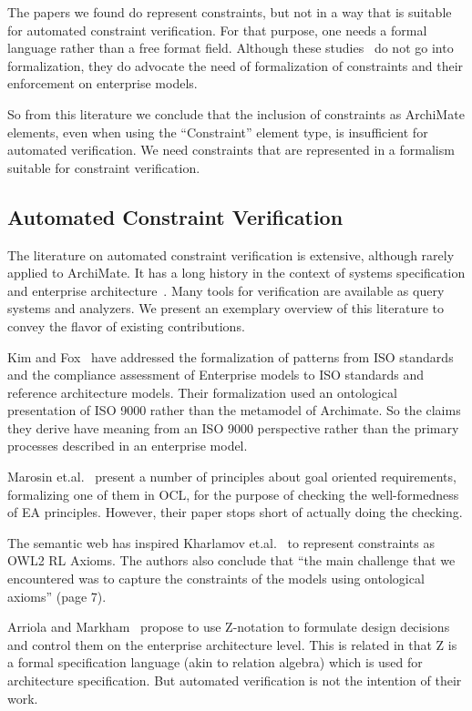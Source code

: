 \documentclass[sn-vancouver]{sn-jnl}%
\begin{document}
The papers we found do represent constraints, but not in a way that is suitable for automated constraint verification.
For that purpose, one needs a formal language rather than a free format field.
Although these studies~\cite{korman2016modeling,tepandi2019towards,mayer2019integrated,zhi2018imsa,blanco2019using} do not go into formalization,
they do advocate the need of formalization of constraints and their enforcement on enterprise models.

So from this literature we conclude that the inclusion of constraints as ArchiMate elements, even when using the ``Constraint'' element type,
is insufficient for automated verification.
We need constraints that are represented in a formalism suitable for constraint verification.

\subsection{Automated Constraint Verification}\label{Verif}
The literature on automated constraint verification is extensive, although rarely applied to ArchiMate.
It has a long history in the context of systems specification and enterprise architecture~\cite{chapurlat2008verification}.
Many tools for verification are available as query systems and analyzers.
We present an exemplary overview of this literature to convey the flavor of existing contributions.

Kim and Fox~\cite{kim2002using} have addressed the formalization of patterns from ISO standards and the compliance assessment of Enterprise models to ISO standards and reference architecture models.
Their formalization used an ontological presentation of ISO 9000 rather than the metamodel of Archimate.
So the claims they derive have meaning from an ISO 9000 perspective rather than the primary processes described in an enterprise model.

Marosin et.al.~\cite{marosin2016principle} present a number of principles about goal oriented requirements, formalizing one of them in OCL,
for the purpose of checking the well-formedness of EA principles. However, their paper stops short of actually doing the checking.

The semantic web has inspired Kharlamov et.al.~\cite{kharlamov2016capturing} to represent constraints as OWL2 RL Axioms.
The authors also conclude that ``the main challenge that we encountered was to capture the constraints of the models using ontological axioms'' (page 7).

Arriola and Markham~\cite{arriola2018towards} propose to use Z-notation to formulate design decisions and control them on the enterprise architecture level.
This is related in that Z is a formal specification language (akin to relation algebra) which is used for architecture specification.
But automated verification is not the intention of their work.
\end{document}
